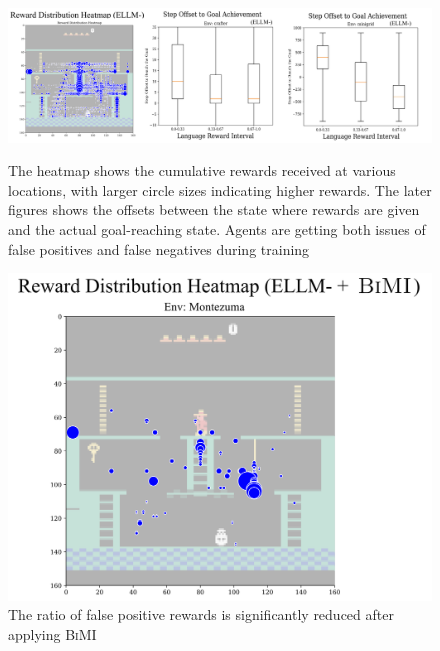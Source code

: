 \documentclass{article}
\theoremstyle{plain}
\theoremstyle{definition}
\theoremstyle{remark}
\begin{document}
\begin{figure}[t]
    \centering
    \begin{minipage}{0.68\textwidth}
        \centering
        \includegraphics[width=\textwidth]{figures/h2_show_prevalence_of_noisy_rewards.png}
        \caption{The heatmap shows the cumulative rewards received at various locations, with larger circle sizes indicating higher rewards. The later figures shows the offsets between the state where rewards are given and the actual goal-reaching state. Agents are getting both issues of false positives and false negatives during training}
        \label{fig:show_prevalence_of_noisy_rewards}
    \end{minipage}
    \hspace{0.1cm}
    \begin{minipage}{0.29\textwidth}
        \centering
        \includegraphics[width=\textwidth]{figures/Reward_Distribution_Heatmap_with_BIMI.png}
        \caption{The ratio of false positive rewards is significantly reduced after applying \textsc{BiMI}}
        \label{fig:reward_distribution_heatmap_with_bimi}
    \end{minipage}

\end{figure}
\end{document}
